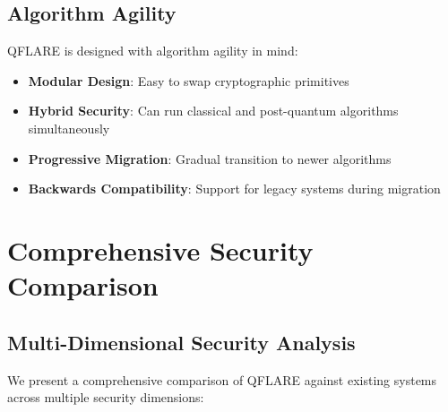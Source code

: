 \documentclass[journal]{IEEEtran}
\begin{document}
\subsection{Algorithm Agility}

QFLARE is designed with algorithm agility in mind:

\begin{itemize}
\item \textbf{Modular Design}: Easy to swap cryptographic primitives
\item \textbf{Hybrid Security}: Can run classical and post-quantum algorithms simultaneously
\item \textbf{Progressive Migration}: Gradual transition to newer algorithms
\item \textbf{Backwards Compatibility}: Support for legacy systems during migration
\end{itemize}

\section{Comprehensive Security Comparison}

\subsection{Multi-Dimensional Security Analysis}

We present a comprehensive comparison of QFLARE against existing systems across multiple security dimensions:
\end{document}
